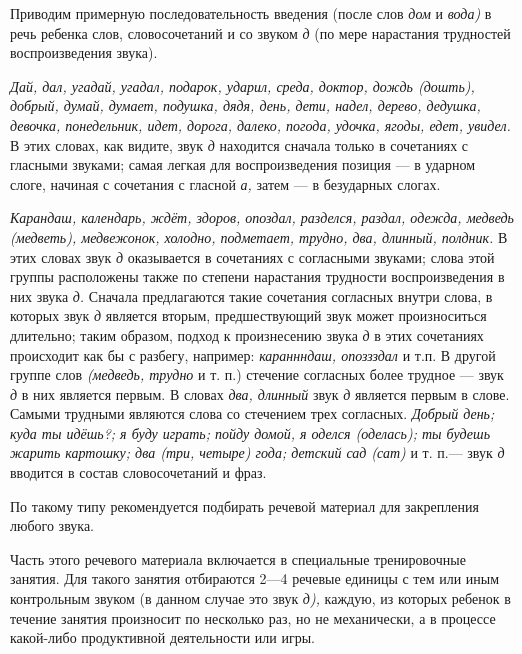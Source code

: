 \documentclass{book}
\renewcommand{\emph}[1]{\textit{#1}}
\begin{document}
Приводим примерную последовательность введения (после слов \emph{дом} и
\emph{вода)} в речь ребенка слов, словосочетаний и со звуком \emph{д}
(по мере нарастания трудностей воспроизведения звука).

\emph{Дай, дал, угадай, угадал, подарок, ударил, среда, доктор, дождь
(дошть), добрый, думай, думает, подушка, дядя, день, дети, надел,
дерево, дедушка, девочка, понедельник, идет, дорога, далеко, погода,
удочка, ягоды, едет, увидел.} В этих словах, как видите, звук \emph{д}
находится сначала только в сочетаниях с гласными звуками; самая легкая
для воспроизведения позиция --- в ударном слоге, начиная с сочетания с
гласной \emph{а,} затем --- в безударных слогах.

\emph{Карандаш, календарь, ждёт, здоров, опоздал, разделся, раздал,
одежда, медведь (медветь), медвежонок, холодно, подметает, трудно, два,
длинный, полдник.} В этих словах звук \emph{д} оказывается в сочетаниях
с согласными звуками; слова этой группы расположены также по степени
нарастания трудности воспроизведения в них звука \emph{д.} Сначала
предлагаются такие сочетания согласных внутри слова, в которых звук
\emph{д} является вторым, предшествующий звук может произноситься
длительно; таким образом, подход к произнесению звука \emph{д} в этих
сочетаниях происходит как бы с разбегу, например: \emph{караннндаш,
опоззздал} и т.п. В другой группе слов \emph{(медведь, трудно} и т. п.)
стечение согласных более трудное --- звук \emph{д} в них является
первым. В словах \emph{два, длинный} звук \emph{д} является первым в
слове. Самыми трудными являются слова со стечением трех согласных.
\emph{Добрый день; куда ты идёшь?; я буду играть; пойду домой, я оделся
(оделась); ты будешь жарить картошку; два (три, четыре) года; детский
сад (сат)} и т. п.--- звук \emph{д} вводится в состав словосочетаний и
фраз.

По такому типу рекомендуется подбирать речевой материал для закрепления
любого звука.

Часть этого речевого материала включается в специальные тренировочные
занятия. Для такого занятия отбираются 2---4 речевые единицы с тем или
иным контрольным звуком (в данном случае это звук \emph{д),} каждую, из
которых ребенок в течение занятия произносит по несколько раз, но не
механически, а в процессе какой-либо продуктивной деятельности или игры.
\end{document}
